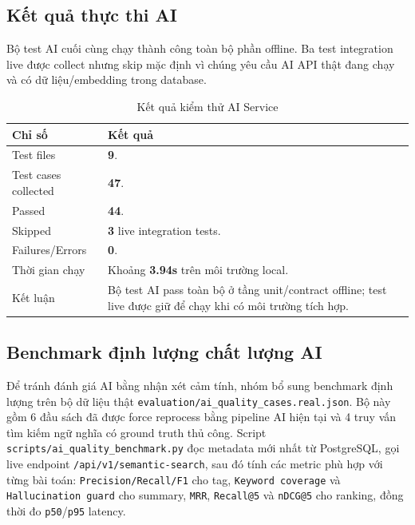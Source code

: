 \subsection{Kết quả thực thi AI}

Bộ test AI cuối cùng chạy thành công toàn bộ phần offline. Ba test integration
live được collect nhưng skip mặc định vì chúng yêu cầu AI API thật đang chạy và
có dữ liệu/embedding trong database.

\begin{table}[H]
\centering
\small
\begin{tabularx}{\textwidth}{|p{4cm}|X|}
\hline
\textbf{Chỉ số} & \textbf{Kết quả} \\
\hline
Test files & \textbf{9}. \\
\hline
Test cases collected & \textbf{47}. \\
\hline
Passed & \textbf{44}. \\
\hline
Skipped & \textbf{3} live integration tests. \\
\hline
Failures/Errors & \textbf{0}. \\
\hline
Thời gian chạy & Khoảng \textbf{3.94s} trên môi trường local. \\
\hline
Kết luận & Bộ test AI pass toàn bộ ở tầng unit/contract offline; test live được giữ để chạy khi có môi trường tích hợp. \\
\hline
\end{tabularx}
\caption{Kết quả kiểm thử AI Service}
\label{tab:ai_test_result}
\end{table}

\subsection{Benchmark định lượng chất lượng AI}

Để tránh đánh giá AI bằng nhận xét cảm tính, nhóm bổ sung benchmark định lượng
trên bộ dữ liệu thật \texttt{evaluation/ai\_quality\_cases.real.json}. Bộ này
gồm 6 đầu sách đã được force reprocess bằng pipeline AI hiện tại và 4 truy vấn
tìm kiếm ngữ nghĩa có ground truth thủ công. Script
\texttt{scripts/ai\_quality\_benchmark.py} đọc metadata mới nhất từ PostgreSQL,
gọi live endpoint \texttt{/api/v1/semantic-search}, sau đó tính các metric phù
hợp với từng bài toán: \texttt{Precision/Recall/F1} cho tag,
\texttt{Keyword coverage} và \texttt{Hallucination guard} cho summary,
\texttt{MRR}, \texttt{Recall@5} và \texttt{nDCG@5} cho ranking, đồng thời đo
\texttt{p50}/\texttt{p95} latency.

